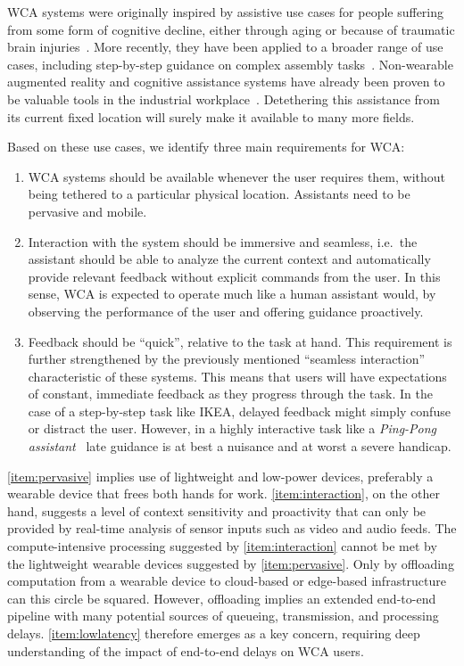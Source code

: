 WCA systems were originally inspired by assistive use cases for people suffering from some form of cognitive decline, either through aging or because of traumatic brain injuries~\cite{Ha:TowardsWearableCogAssist,satya2019augmenting}.
More recently, they have been applied to a broader range of use cases, including step-by-step guidance on complex assembly tasks~\cite{Chen:AnEmpiricalStudyOfLatency}.
Non-wearable augmented reality and cognitive assistance systems have already been proven to be valuable tools in the industrial workplace~\cite{funk2015caworkplace,gorecky2011cognito}.
Detethering this assistance from its current fixed location will surely make it available to many more fields. 

Based on these use cases, we identify three main requirements for WCA:\@
\begin{enumerate}
    \item\label{item:pervasive} WCA systems should be available whenever the user requires them, without being tethered to a particular physical location. Assistants need to be pervasive and mobile.

    \item\label{item:interaction} Interaction with the system should be immersive and seamless, i.e.\ the assistant should be able to analyze the current context and automatically provide relevant feedback without explicit commands from the user.
    In this sense, WCA is expected to operate much like a human assistant would, by observing the performance of the user and offering guidance proactively.

    \item\label{item:lowlatency} Feedback should be ``quick'', relative to the task at hand. 
    This requirement is further strengthened by the previously mentioned ``seamless interaction'' characteristic of these systems.
    This means that users will have expectations of constant, immediate feedback as they progress through the task.
    In the case of a step-by-step task like IKEA, delayed feedback might simply confuse or distract the user.
    However, in a highly interactive task like a \emph{Ping-Pong assistant}~\cite{PingPongAssistant, Chen:EarlyImplementation} late guidance is at best a nuisance and at worst a severe handicap.
\end{enumerate}

\cref{item:pervasive} implies use of lightweight and low-power devices, preferably a wearable device that frees both hands for work.
\cref{item:interaction}, on the other hand, suggests a level of context sensitivity and proactivity that can only be provided by real-time analysis of sensor inputs such as video and audio feeds.
The compute-intensive processing suggested by \cref{item:interaction} cannot be met by the lightweight wearable devices suggested by \cref{item:pervasive}.
Only by offloading computation from a wearable device to cloud-based or edge-based infrastructure can this circle be squared.
However, offloading implies an extended end-to-end pipeline with many potential sources of queueing, transmission, and processing delays.
\cref{item:lowlatency} therefore emerges as a key concern, requiring deep understanding of the impact of end-to-end delays on WCA users.

